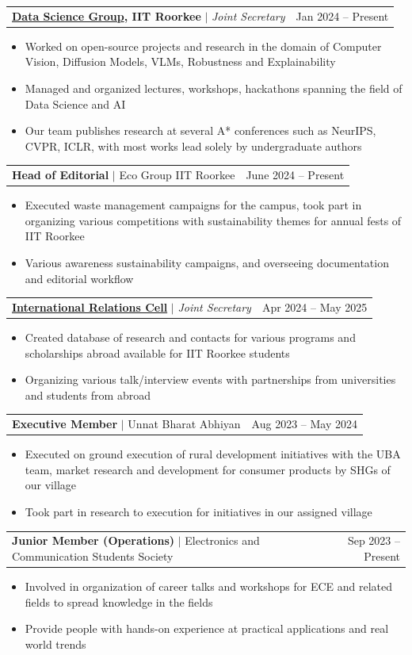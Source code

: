 \documentclass[letterpaper,11pt]{article}
\makeatletter
\newcommand{\resumeItem}[1]{
  \item\small{
    {#1 \vspace{-2pt}}
  }
}
\newcommand{\resumeProjectHeading}[2]{
    \item
    \begin{tabular*}{0.97\textwidth}{l@{\extracolsep{\fill}}r}
      \small#1 & \small#2 \\
    \end{tabular*}\vspace{-7pt}
}
\newcommand{\resumeItemListStart}{\begin{itemize}}
\newcommand{\resumeItemListEnd}{\end{itemize}\vspace{-9pt}}
\makeatother
\begin{document}
      \resumeProjectHeading
          {\textbf{\href{https://dsgiitr.github.io/dsg-website/}{Data Science Group}, IIT Roorkee} $|$ \emph{Joint Secretary}}
          {Jan 2024 -- Present}
          \resumeItemListStart
            \resumeItem{Worked on open-source projects and research in the domain of Computer Vision, Diffusion Models, VLMs, Robustness and Explainability}
            \resumeItem{Managed and organized lectures, workshops, hackathons spanning the field of Data Science and AI}
            \resumeItem{Our team publishes research at several A* conferences such as NeurIPS, CVPR, ICLR, with most works lead solely by undergraduate authors}
          \resumeItemListEnd

      \resumeProjectHeading
          {\textbf{Head of Editorial} $|$ Eco Group IIT Roorkee}
          {June 2024 -- Present}
          \resumeItemListStart
            \resumeItem{Executed waste management campaigns for the campus, took part in organizing various competitions with sustainability themes for annual fests of IIT Roorkee}
            \resumeItem{Various awareness sustainability campaigns, and overseeing documentation and editorial workflow}
          \resumeItemListEnd
          
      \resumeProjectHeading
          {\textbf{\href{https://ir.iitr.ac.in/HomePage}{International Relations Cell}} $|$ \emph{Joint Secretary}}
          {Apr 2024 -- May 2025}
          \resumeItemListStart
            \resumeItem{Created database of research and contacts for various programs and scholarships abroad available for IIT Roorkee students}
            \resumeItem{Organizing various talk/interview events with partnerships from universities and students from abroad}
          \resumeItemListEnd

      \resumeProjectHeading
          {\textbf{Executive Member} $|$ Unnat Bharat Abhiyan}
          {Aug 2023 -- May 2024}
          \resumeItemListStart
            \resumeItem{Executed on ground execution of rural development initiatives with the UBA team, market research and development for consumer products by SHGs of our village}
            \resumeItem{Took part in research to execution for initiatives in our assigned village}
          \resumeItemListEnd

      \resumeProjectHeading
          {\textbf{Junior Member (Operations)} $|$ Electronics and Communication Students Society}
          {Sep 2023 -- Present}
          \resumeItemListStart
            \resumeItem{Involved in organization of career talks and workshops for ECE and related fields to spread knowledge in the fields}
            \resumeItem{Provide people with hands-on experience at practical applications and real world trends}
          \resumeItemListEnd
\end{document}

